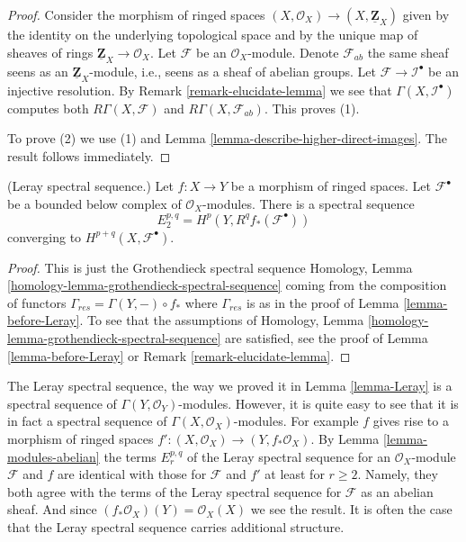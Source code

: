 \begin{proof}
Consider the morphism of ringed spaces
$(X, \mathcal{O}_X) \to (X, \underline{\mathbf{Z}}_X)$ given
by the identity on the underlying topological space and by
the unique map of sheaves of rings
$\underline{\mathbf{Z}}_X \to \mathcal{O}_X$.
Let $\mathcal{F}$ be an $\mathcal{O}_X$-module.
Denote $\mathcal{F}_{ab}$ the same sheaf seens as an
$\underline{\mathbf{Z}}_X$-module, i.e., seens as a sheaf of
abelian groups. Let
$\mathcal{F} \to \mathcal{I}^\bullet$ be an injective resolution.
By Remark \ref{remark-elucidate-lemma} we see that
$\Gamma(X, \mathcal{I}^\bullet)$ computes both
$R\Gamma(X, \mathcal{F})$ and $R\Gamma(X, \mathcal{F}_{ab})$.
This proves (1).

\medskip\noindent
To prove (2) we use (1) and Lemma \ref{lemma-describe-higher-direct-images}.
The result follows immediately.
\end{proof}

\begin{lemma}
\label{lemma-Leray}
(Leray spectral sequence.)
Let $f : X \to Y$ be a morphism of ringed spaces.
Let $\mathcal{F}^\bullet$ be
a bounded below complex of $\mathcal{O}_X$-modules.
There is a spectral sequence
$$
E_2^{p, q} = H^p(Y, R^qf_*(\mathcal{F}^\bullet))
$$
converging to $H^{p + q}(X, \mathcal{F}^\bullet)$.
\end{lemma}

\begin{proof}
This is just the Grothendieck spectral sequence
Homology, Lemma \ref{homology-lemma-grothendieck-spectral-sequence}
coming from the composition of functors
$\Gamma_{res} = \Gamma(Y, -) \circ f_*$ where $\Gamma_{res}$ is as
in the proof of Lemma \ref{lemma-before-Leray}.
To see that the assumptions of
Homology, Lemma \ref{homology-lemma-grothendieck-spectral-sequence}
are satisfied, see the proof of Lemma \ref{lemma-before-Leray} or
Remark \ref{remark-elucidate-lemma}.
\end{proof}

\begin{remark}
\label{remark-Leray-ss-more-structure}
The Leray spectral sequence, the way we proved it in Lemma \ref{lemma-Leray}
is a spectral sequence of $\Gamma(Y, \mathcal{O}_Y)$-modules. However, it
is quite easy to see that it is in fact a spectral sequence of
$\Gamma(X, \mathcal{O}_X)$-modules. For example $f$ gives rise to
a morphism of ringed spaces
$f' :  (X, \mathcal{O}_X) \to (Y, f_*\mathcal{O}_X)$.
By Lemma \ref{lemma-modules-abelian} the terms $E_r^{p, q}$ of the
Leray spectral sequence for an $\mathcal{O}_X$-module $\mathcal{F}$
and $f$ are identical with those for $\mathcal{F}$ and $f'$
at least for $r \geq 2$. Namely, they both agree with the terms of the Leray
spectral sequence for $\mathcal{F}$ as an abelian sheaf.
And since $(f_*\mathcal{O}_X)(Y) = \mathcal{O}_X(X)$ we see the result.
It is often the case
that the Leray spectral sequence carries additional structure.
\end{remark}

